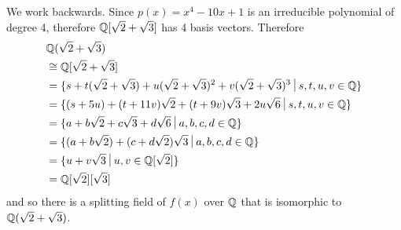 \begin{questions}
\begin{partquestions}{\roman*}
        \item We work backwards. Since $p(x) = x^4 - 10x + 1$ is an irreducible polynomial of degree 4, therefore $\mathbb{Q}[\sqrt2 + \sqrt3]$ has 4 basis vectors. Therefore
        \begin{align*}
            &\Q(\sqrt2 + \sqrt3)\\
            &\cong \Q[\sqrt2 + \sqrt3]\\
            &= \{s + t(\sqrt2 + \sqrt3) + u(\sqrt2 + \sqrt3)^2 + v(\sqrt2 + \sqrt3)^3 \vert s,t,u,v \in \Q\}\\
            &= \{(s + 5u) + (t + 11v)\sqrt2 + (t + 9v)\sqrt3 + 2u\sqrt6 \vert s, t, u, v \in \Q\}\\
            &= \{a + b\sqrt2 + c\sqrt3 + d\sqrt6 \vert a, b, c, d \in \Q\}\\
            &=\{(a+b\sqrt2) + (c+d\sqrt2)\sqrt3 \vert a, b, c, d \in \Q\}\\
            &=\{u + v\sqrt3 \vert u, v \in \Q[\sqrt2]\}\\
            &= \Q[\sqrt2][\sqrt3]
        \end{align*}
        and so there is a splitting field of $f(x)$ over $\mathbb{Q}$ that is isomorphic to $\mathbb{Q}(\sqrt2 + \sqrt3)$.
    \end{partquestions}
\end{questions}

